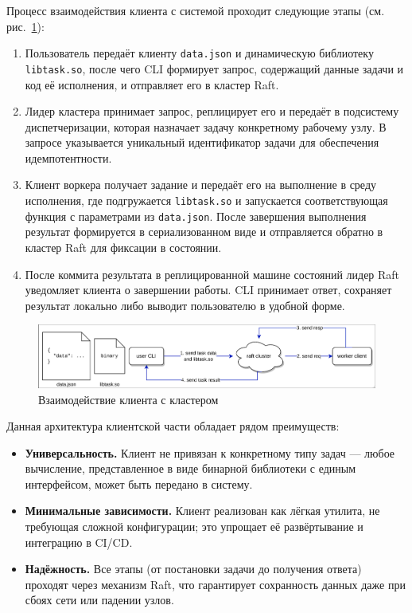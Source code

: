 Процесс взаимодействия клиента с системой проходит следующие этапы (см.
рис.~\ref{fig:client-arch}):
\begin{enumerate}
    \item Пользователь передаёт клиенту \texttt{data.json} и
    динамическую библиотеку \texttt{libtask.so}, после чего CLI
    формирует запрос, содержащий данные задачи и код её исполнения,
    и отправляет его в кластер Raft.
    \item Лидер кластера принимает запрос, реплицирует его
    и передаёт в подсистему диспетчеризации, которая назначает
    задачу конкретному рабочему узлу. В запросе указывается
    уникальный идентификатор задачи для обеспечения идемпотентности.
    \item Клиент воркера получает задание и передаёт его на выполнение
    в среду исполнения, где подгружается \texttt{libtask.so} и
    запускается соответствующая функция с параметрами из \texttt{data.json}.
    После завершения выполнения результат формируется в сериализованном
    виде и отправляется обратно в кластер Raft для фиксации в состоянии.
    \item После коммита результата в реплицированной машине состояний
    лидер Raft уведомляет клиента о завершении работы. CLI принимает
    ответ, сохраняет результат локально либо выводит пользователю
    в удобной форме.
\end{enumerate}

\begin{figure}
  \centering
  \includegraphics[scale=0.4]{inc/client-arch.png}
  \caption{Взаимодействие клиента с кластером}
  \label{fig:client-arch}
\end{figure}

Данная архитектура клиентской части обладает рядом преимуществ:
\begin{itemize}
    \item \textbf{Универсальность.} Клиент не привязан к конкретному
    типу задач — любое вычисление, представленное в виде бинарной
    библиотеки с единым интерфейсом, может быть передано в систему.
    \item \textbf{Минимальные зависимости.} Клиент реализован как
    лёгкая утилита, не требующая сложной конфигурации;
    это упрощает её развёртывание и интеграцию в CI/CD.
    \item \textbf{Надёжность.} Все этапы (от постановки задачи до
    получения ответа) проходят через механизм Raft, что гарантирует
    сохранность данных даже при сбоях сети или падении узлов.
\end{itemize}

